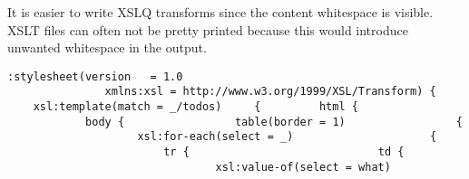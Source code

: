 \documentclass[10pt,a4paper]{article}
\newcommand{\xmqNS}[1]{{\color{xmqNS}#1}}
\newcommand{\xmqEN}[1]{{\color{xmqEN}#1}}
\newcommand{\xmqAK}[1]{{\color{xmqAK}#1}}
\newcommand{\xmqAKV}[1]{{\color{xmqAKV}#1}}
\newcommand{\xmqNSD}[1]{{\color{xmqNSD}#1}}
\newcommand{\xmqXSL}[1]{{\color{xmqXSL}#1}}
\newcommand{\xmqI}[0]{{\mbox{\ }}}
\begin{document}
{\flushleft{\large\textsc{\color{Red}{XSLT}}}} It is easier to write XSLQ transforms since
the content whitespace is visible. XSLT files can often not be pretty printed
because this would introduce unwanted whitespace in the output.

\vspace{-5mm}
\texttt{\flushleft\noindent \xmqNS{xsl}:\xmqXSL{stylesheet}(\xmqAK{version}\xmqI \xmqI \xmqI =\xmqI \xmqAKV{1.0}\linebreak
\xmqI \xmqI \xmqI \xmqI \xmqI \xmqI \xmqI \xmqI \xmqI \xmqI \xmqI \xmqI \xmqI \xmqI \xmqI \xmqNSD{xmlns}:\xmqXSL{xsl}\xmqI =\xmqI \xmqAKV{http://www.w3.org/1999/XSL/Transform})\linebreak
\{\linebreak
\xmqI \xmqI \xmqI \xmqI \xmqNS{xsl}:\xmqXSL{template}(\xmqAK{match}\xmqI =\xmqI \xmqAKV{\_/todos})\linebreak
\xmqI \xmqI \xmqI \xmqI \{\linebreak
\xmqI \xmqI \xmqI \xmqI \xmqI \xmqI \xmqI \xmqI \xmqEN{html}\xmqI \{\linebreak
\xmqI \xmqI \xmqI \xmqI \xmqI \xmqI \xmqI \xmqI \xmqI \xmqI \xmqI \xmqI \xmqEN{body}\xmqI \{\linebreak
\xmqI \xmqI \xmqI \xmqI \xmqI \xmqI \xmqI \xmqI \xmqI \xmqI \xmqI \xmqI \xmqI \xmqI \xmqI \xmqI \xmqEN{table}(\xmqAK{border}\xmqI =\xmqI \xmqAKV{1})\linebreak
\xmqI \xmqI \xmqI \xmqI \xmqI \xmqI \xmqI \xmqI \xmqI \xmqI \xmqI \xmqI \xmqI \xmqI \xmqI \xmqI \{\linebreak
\xmqI \xmqI \xmqI \xmqI \xmqI \xmqI \xmqI \xmqI \xmqI \xmqI \xmqI \xmqI \xmqI \xmqI \xmqI \xmqI \xmqI \xmqI \xmqI \xmqI \xmqNS{xsl}:\xmqXSL{for-each}(\xmqAK{select}\xmqI =\xmqI \xmqAKV{\_})\linebreak
\xmqI \xmqI \xmqI \xmqI \xmqI \xmqI \xmqI \xmqI \xmqI \xmqI \xmqI \xmqI \xmqI \xmqI \xmqI \xmqI \xmqI \xmqI \xmqI \xmqI \{\linebreak
\xmqI \xmqI \xmqI \xmqI \xmqI \xmqI \xmqI \xmqI \xmqI \xmqI \xmqI \xmqI \xmqI \xmqI \xmqI \xmqI \xmqI \xmqI \xmqI \xmqI \xmqI \xmqI \xmqI \xmqI \xmqEN{tr}\xmqI \{\linebreak
\xmqI \xmqI \xmqI \xmqI \xmqI \xmqI \xmqI \xmqI \xmqI \xmqI \xmqI \xmqI \xmqI \xmqI \xmqI \xmqI \xmqI \xmqI \xmqI \xmqI \xmqI \xmqI \xmqI \xmqI \xmqI \xmqI \xmqI \xmqI \xmqEN{td}\xmqI \{\linebreak
\xmqI \xmqI \xmqI \xmqI \xmqI \xmqI \xmqI \xmqI \xmqI \xmqI \xmqI \xmqI \xmqI \xmqI \xmqI \xmqI \xmqI \xmqI \xmqI \xmqI \xmqI \xmqI \xmqI \xmqI \xmqI \xmqI \xmqI \xmqI \xmqI \xmqI \xmqI \xmqI \xmqNS{xsl}:\xmqXSL{value-of}(\xmqAK{select}\xmqI =\xmqI \xmqAKV{what})\linebreak
}
\end{document}
